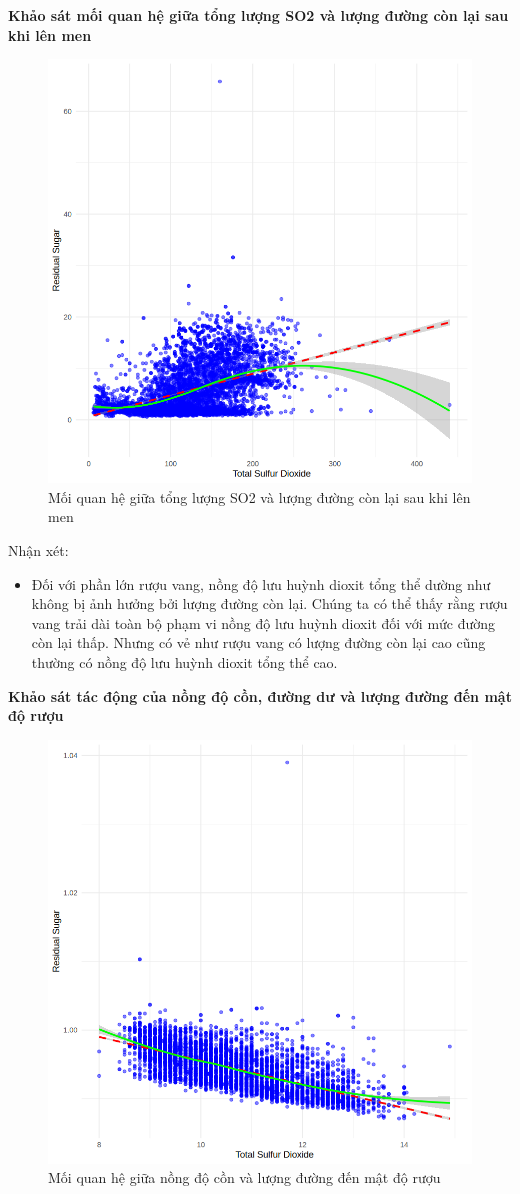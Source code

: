 \textbf{Khảo sát mối quan hệ giữa tổng lượng SO2 và lượng đường còn lại sau khi lên men}
\begin{figure}[H]
    \centering
    \includegraphics[width=0.75\columnwidth]{wine_colors/wine_sulfur_sugar.png}
    \caption{Mối quan hệ giữa tổng lượng SO2 và lượng đường còn lại sau khi lên men}
    \label{fig:wine_sulfur_sugar}
\end{figure}
Nhận xét:
\begin{itemize}
    \item Đối với phần lớn rượu vang, nồng độ lưu huỳnh dioxit tổng thể dường như không bị ảnh hưởng bởi lượng đường còn lại. Chúng ta có thể thấy rằng rượu vang trải dài toàn bộ phạm vi nồng độ lưu huỳnh dioxit đối với mức đường còn lại thấp. Nhưng có vẻ như rượu vang có lượng đường còn lại cao cũng thường có nồng độ lưu huỳnh dioxit tổng thể cao.
\end{itemize}

\textbf{Khảo sát tác động của nồng độ cồn, đường dư và lượng đường đến mật độ rượu}
\begin{figure}[H]
    \centering
    \includegraphics[width=0.75\columnwidth]{wine_colors/wine_alcohol_density.png}
    \caption{Mối quan hệ giữa nồng độ cồn và lượng đường đến mật độ rượu}
    \label{fig:wine_alcohol_density}
\end{figure}

